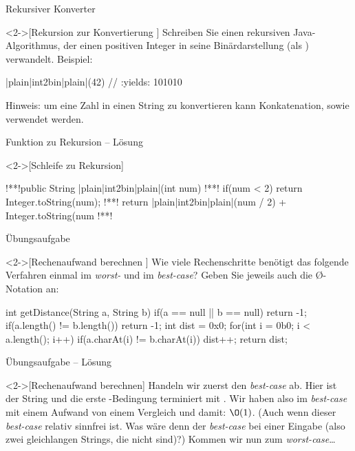 \begin{frame}[fragile,c]{Rekursiver Konverter}
    \begin{exercise}<2->[Rekursion zur Konvertierung ]
        \pause{}Schreiben Sie einen rekursiven Java-Algorithmus, der einen positiven Integer in seine Binärdarstellung (als ) verwandelt.\pause{}
        Beispiel:\pause{}
\begin{plainjava}
|plain|int2bin|plain|(42) // :yields: 101010
\end{plainjava}
    \pause{}Hinweis: um eine Zahl in einen String zu konvertieren kann Konkatenation,\pause{} sowie  verwendet werden.
    \end{exercise}
\end{frame}

\begin{frame}[fragile,c]{Funktion zu Rekursion -- Lösung}
    \begin{solve}<2->[Schleife zu Rekursion]
\begin{plainjava}
!**!public String |plain|int2bin|plain|(int num){
!**!    if(num < 2) return Integer.toString(num);
!**!    return |plain|int2bin|plain|(num / 2) + Integer.toString(num %
!**!}
\end{plainjava}
    \end{solve}
\end{frame}


\begin{frame}[fragile,c]{Übungsaufgabe}
    \begin{exercise}<2->[Rechenaufwand berechnen ]
        \pause{}Wie viele Rechenschritte benötigt das folgende Verfahren einmal im \emph{worst-} und im \emph{best-case}? Geben Sie jeweils auch die \O-Notation an: \pause{}
\begin{plainjava}
int getDistance(String a, String b){
    if(a == null || b == null) return -1;
    if(a.length() != b.length()) return -1;
    int dist = 0x0;
    for(int i = 0b0; i < a.length(); i++)
        if(a.charAt(i) != b.charAt(i))
            dist++;
    return dist;
}
\end{plainjava}
    \end{exercise}
\end{frame}

\begin{frame}[c]{Übungsaufgabe -- Lösung}
    \begin{solve}<2->[Rechenaufwand berechnen]
    \pause{}Handeln wir zuerst den \emph{best-case} ab.\pause{} Hier ist der String   und die erste -Bedingung terminiert mit .\pause{} Wir haben also im \emph{best-case} mit einem Aufwand von einem Vergleich und damit: \(\O(1)\).\pause{} (Auch wenn dieser \emph{best-case} relativ sinnfrei ist.\pause{} Was wäre denn der \emph{best-case} bei einer  Eingabe\pause{} (also zwei gleichlangen Strings, die nicht  sind)?)\pause{} Kommen wir nun zum \emph{worst-case}\ldots
    \end{solve}
\end{frame}

